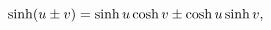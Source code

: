 \[\mathop{\sinh\/}\nolimits\!\left(u\pm v\right)=\mathop{\sinh\/}\nolimits u%
\mathop{\cosh\/}\nolimits v\pm\mathop{\cosh\/}\nolimits u\mathop{\sinh\/}%
\nolimits v,\]
